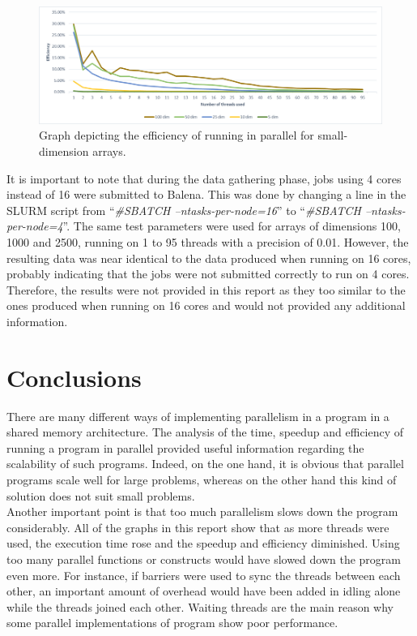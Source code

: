 \documentclass[letterpaper,12pt]{article}
\begin{document}
\begin{figure}[h]
\centerline{\includegraphics[width=\textwidth]{report/plots/efficiency_small.png}}
\caption{\label{fig:efficiency_small}Graph depicting the efficiency of running in parallel for small-dimension arrays.}
\end{figure}

It is important to note that during the data gathering phase, jobs using 4 cores instead of 16 were submitted to Balena. This was done by changing a line in the SLURM script from ``\textit{\#SBATCH --ntasks-per-node=16}'' to ``\textit{\#SBATCH --ntasks-per-node=4}''. The same test parameters were used for arrays of dimensions 100, 1000 and 2500, running on 1 to 95 threads with a precision of 0.01. However, the resulting data was near identical to the data produced when running on 16 cores, probably indicating that the jobs were not submitted correctly to run on 4 cores. Therefore, the results were not provided in this report as they too similar to the ones produced when running on 16 cores and would not provided any additional information.\\



\section{Conclusions}
There are many different ways of implementing parallelism in a program in a shared memory architecture. The analysis of the time, speedup and efficiency of running a program in parallel provided useful information regarding the scalability of such programs. Indeed, on the one hand, it is obvious that parallel programs scale well for large problems, whereas on the other hand this kind of solution does not suit small problems. \\

Another important point is that too much parallelism slows down the program considerably. All of the graphs in this report show that as more threads were used, the execution time rose and the speedup and efficiency diminished. Using too many parallel functions or constructs would have slowed down the program even more. For instance, if barriers were used to sync the threads between each other, an important amount of overhead would have been added in idling alone while the threads joined each other. Waiting threads are the main reason why some parallel implementations of program show poor performance.\\
\end{document}
